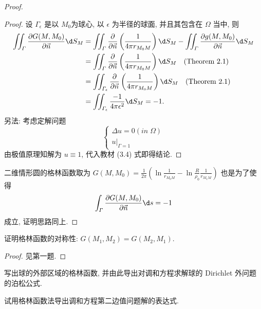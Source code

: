 \begin{proof}
  \begin{proof}
    设 $\varGamma_{\epsilon}$ 是以 $M_0$为球心,
    以 $\epsilon$ 为半径的球面, 并且其包含在 $\varOmega$ 当中, 则
    \[\begin{split}
      \iint_{\varGamma}\frac{\partial G(M,M_0)}{\partial\vec{n}}\d S_M
      & = \iint_{\varGamma}\frac{\partial}{\partial\vec{n}}\left(\frac{1}{4\pi r_{M_0M}}\right)\d S_M-\iint_{\varGamma}\frac{\partial g(M,M_0)}{\partial\vec{n}}\d S_M \\
      & = \iint_{\varGamma}\frac{\partial}{\partial\vec{n}}
          \left(\frac{1}{4\pi r_{M_0M}}\right)\d S_M\quad (\text{Theorem 2.1}) \\
      & = \iint_{\varGamma_{\epsilon}}\frac{\partial}{\partial\vec{n}}
          \left(\frac{1}{4\pi r_{M_0M}}\right)\d S_M\quad (\text{Theorem 2.1}) \\
      & = \iint_{\varGamma_{\epsilon}}\frac{-1}{4\pi\epsilon^2}\d S_M = -1.
    \end{split}\]
    另法: 考虑定解问题
    \[\begin{cases}
      \Delta u=0(in\;\varOmega) \\
      u|_{\varGamma=1}
    \end{cases}\]
    由极值原理知解为 $u\equiv1$, 代入教材 (3.4) 式即得结论.
  \end{proof}

  二维情形圆的格林函数取为 $G(M,M_0)=\frac{1}{2\pi}\left(\ln\frac{1}{r_{M_0M}}-\ln\frac{R}{\rho_0}\frac{1}{r_{M_1M}}\right)$
  也是为了使得
  \[ \int_{\varGamma}\frac{\partial G(M,M_0)}{\partial\vec{n}}\d s = -1 \]
  成立, 证明思路同上.
\end{proof}


\begin{exercise}
  证明格林函数的对称性: $G(M_1,M_2) = G(M_2,M_1)$.
\end{exercise}

\begin{proof}
  见第一题.
\end{proof}


\begin{exercise}
  写出球的外部区域的格林函数, 并由此导出对调和方程求解球的 Dirichlet 外问题的泊松公式.
\end{exercise}


\begin{exercise}
  试用格林函数法导出调和方程第二边值问题解的表达式.
\end{exercise}

